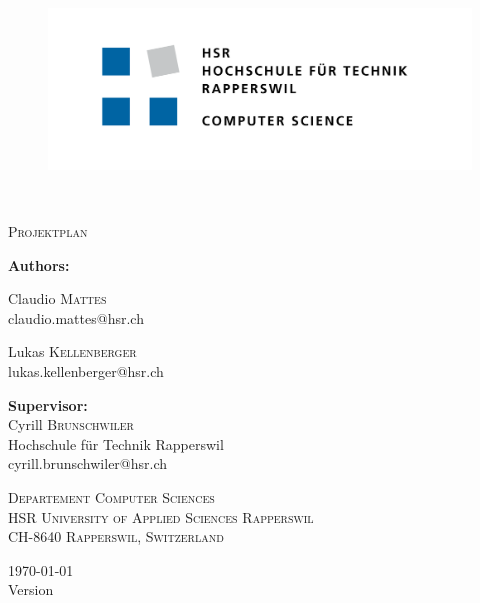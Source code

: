 \begin{titlepage}
	\centering
	\begin{figure}
		\centering
		\includegraphics[width=0.7\linewidth]{./assets/logo/hsr.png}  	
	\end{figure}
	\
	\vfill
	{\huge\bfseries \TITLE\par}
	\vspace{2mm}
	{\scshape\Large Projektplan\par}
	\vfill

	{\Large\textbf{Authors:} \\\vspace{0.2cm}}
	{\Large Claudio \textsc{Mattes} \\\small claudio.mattes@hsr.ch \par\vspace{0.2cm}
	\Large Lukas \textsc{Kellenberger} \\\small lukas.kellenberger@hsr.ch}

	\vspace{0.6cm}
	{\Large\textbf{Supervisor:} \\\vspace{0.2cm}}
	Cyrill \textsc{Brunschwiler}  \\ {\small Hochschule für Technik Rapperswil} \\\small cyrill.brunschwiler@hsr.ch \\

	\vspace{0.6cm}

	\vfill
	{\scshape\scriptsize Departement Computer Sciences \\ HSR University of Applied Sciences Rapperswil \\ CH-8640 Rapperswil, Switzerland \par}

	\vfill

    {\large \today \\ \small Version \VERSION}
\end{titlepage}